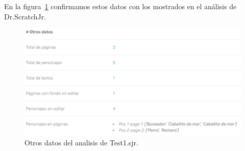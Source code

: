 \documentclass[a4paper, 12pt]{book}
\begin{document}
En la figura~\ref{fig:otros_datos_Test1} confirmamos estos datos con los mostrados en el análisis de Dr.ScratchJr.

\begin{figure}[H]
  \centering
  \includegraphics[width=14cm, keepaspectratio]{img/otros_datos_Test1.png}
  \caption{Otros datos del analisis de Test1.sjr.}
  \label{fig:otros_datos_Test1}
\end{figure}

\newpage
\end{document}
